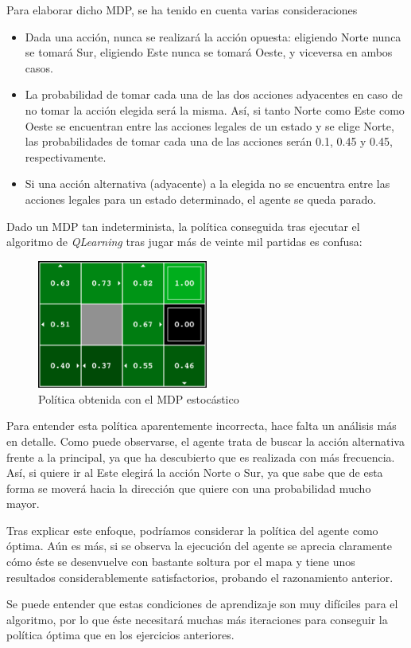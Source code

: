 \documentclass[12pt]{article}
\begin{document}
Para elaborar dicho MDP, se ha tenido en cuenta varias consideraciones
\begin{itemize}
    \item Dada una acción, nunca se realizará la acción opuesta: eligiendo Norte nunca se tomará Sur, eligiendo Este nunca se tomará Oeste, y viceversa en ambos casos.
    \item La probabilidad de tomar cada una de las dos acciones adyacentes en caso de no tomar la acción elegida será la misma. Así, si tanto Norte como Este como Oeste se encuentran entre las acciones legales de un estado y se elige Norte, las probabilidades de tomar cada una de las acciones serán 0.1, 0.45 y 0.45, respectivamente.
    \item Si una acción alternativa (adyacente) a la elegida no se encuentra entre las acciones legales para un estado determinado, el agente se queda parado.
\end{itemize}

Dado un MDP tan indeterminista, la política conseguida tras ejecutar el algoritmo de \textit{QLearning} tras jugar más de veinte mil partidas es confusa:

\begin{figure}[h]
    \centering
    \includegraphics[width=0.5\textwidth]{policy_stochastic09}
    \caption{Política obtenida con el MDP estocástico}
\end{figure}

Para entender esta política aparentemente incorrecta, hace falta un análisis más en detalle. Como puede observarse, el agente trata de buscar la acción alternativa frente a la principal, ya que ha descubierto que es realizada con más frecuencia. Así, si quiere ir al Este elegirá la acción Norte o Sur, ya que sabe que de esta forma se moverá hacia la dirección que quiere con una probabilidad mucho mayor.

Tras explicar este enfoque, podríamos considerar la política del agente como óptima. Aún es más, si se observa la ejecución del agente se aprecia claramente cómo éste se desenvuelve con bastante soltura por el mapa y tiene unos resultados considerablemente satisfactorios, probando el razonamiento anterior.

Se puede entender que estas condiciones de aprendizaje son muy difíciles para el algoritmo, por lo que éste necesitará muchas más iteraciones para conseguir la política óptima que en los ejercicios anteriores.
\end{document}

